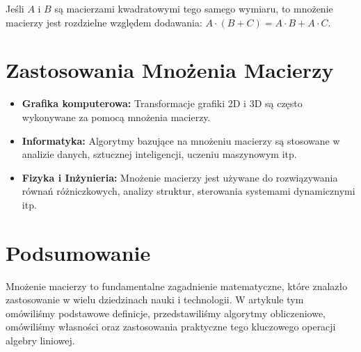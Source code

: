 \documentclass[12pt]{article}
\begin{document}
\begin{theorem}
Jeśli $A$ i $B$ są macierzami kwadratowymi tego samego wymiaru, to mnożenie macierzy jest rozdzielne względem dodawania: $A \cdot (B + C) = A \cdot B + A \cdot C$.
\end{theorem}

\section{Zastosowania Mnożenia Macierzy}
\begin{itemize}
  \item \textbf{Grafika komputerowa:} Transformacje grafiki 2D i 3D są często wykonywane za pomocą mnożenia macierzy.
  
  \item \textbf{Informatyka:} Algorytmy bazujące na mnożeniu macierzy są stosowane w analizie danych, sztucznej inteligencji, uczeniu maszynowym itp.
  
  \item \textbf{Fizyka i Inżynieria:} Mnożenie macierzy jest używane do rozwiązywania równań różniczkowych, analizy struktur, sterowania systemami dynamicznymi itp.
\end{itemize}

\section{Podsumowanie}
Mnożenie macierzy to fundamentalne zagadnienie matematyczne, które znalazło zastosowanie w wielu dziedzinach nauki i technologii. W artykule tym omówiliśmy podstawowe definicje, przedstawiliśmy algorytmy obliczeniowe, omówiliśmy własności oraz zastosowania praktyczne tego kluczowego operacji algebry liniowej.
\end{document}
